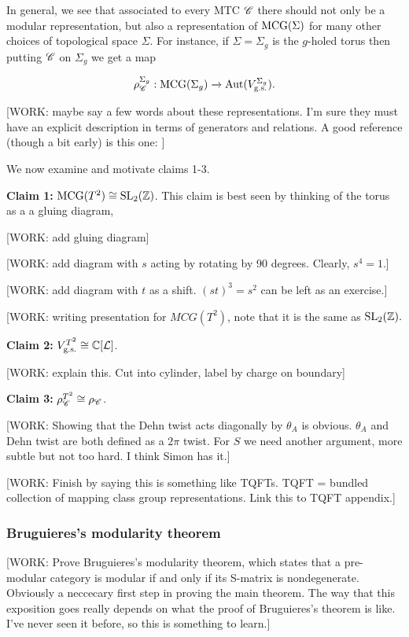 In general, we see that associated to every MTC $\mathscr{C}$ there should not only be a modular representation, but also a representation of $\operatorname{MCG}(\Sigma)$ for many other choices of topological space $\Sigma$. For instance, if $\Sigma=\Sigma_g$ is the $g$-holed torus then putting $\mathscr{C}$ on $\Sigma_g$ we get a map

$$\rho_{\mathscr{C}}^{\Sigma_g}:\operatorname{MCG}(\Sigma_g)\xrightarrow{}\operatorname{Aut}(V_{\text{g.s.}}^{\Sigma_g}).$$

[WORK: maybe say a few words about these representations. I'm sure they must have an explicit description in terms of generators and relations. A good reference (though a bit early) is this one: \cite{lyubashenko1995invariants}]

We now examine and motivate claims 1-3.

\textbf{Claim 1:} $\operatorname{MCG}(T^2)\cong \operatorname{SL}_2(\mathbb{Z})$. This claim is best seen by thinking of the torus as a a gluing diagram,

[WORK: add gluing diagram]

[WORK: add diagram with $s$ acting by rotating by 90 degrees. Clearly, $s^4=1$.]

[WORK: add diagram with $t$ as a shift. $(st)^3=s^2$ can be left as an exercise.]

[WORK: writing presentation for $MCG(T^2)$, note that it is the same as $\operatorname{SL}_2(\mathbb{Z}).$

\textbf{Claim 2:} $V_{\text{g.s.}}^{T^2}\cong \mathbb{C}[\mathcal{L}]$.

[WORK: explain this. Cut into cylinder, label by charge on boundary]

\textbf{Claim 3:} $\rho_{\mathscr{C}}^{T^2}\cong \rho_{\mathscr{C}}$.

[WORK: Showing that the Dehn twist acts diagonally by $\theta_A$ is obvious. $\theta_A$ and Dehn twist are both defined as a $2\pi$ twist. For $S$ we need another argument, more subtle but not too hard. I think Simon has it.]


[WORK: Finish by saying this is something like TQFTs. TQFT = bundled collection of mapping class group representations. Link this to TQFT appendix.]

\subsubsection{Bruguieres's modularity theorem}

[WORK: Prove Bruguieres's modularity theorem, which states that a pre-modular category is modular if and only if its S-matrix is nondegenerate. Obviously a neccecary first step in proving the main theorem. The way that this exposition goes really depends on what the proof of Bruguieres's theorem is like. I've never seen it before, so this is something to learn.]



